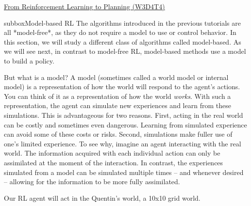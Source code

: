 \begin{textbox}{\href{https://compneuro.neuromatch.io/tutorials/W3D4_ReinforcementLearning/student/W3D4_Tutorial4.html}{From Reinforcement Learning to Planning (W3D4T4)} }

\begin{subbox}{subbox}{Model-based RL}
\scriptsize
The algorithms introduced in the previous tutorials are all *model-free*, as they do not require a model to use or control behavior. In this section, we will study a different class of algorithms called model-based. As we will see next, in contrast to model-free RL, model-based methods use a model to build a policy.

But what is a model? A model (sometimes called a world model or internal model) is a representation of how the world will respond to the agent's actions. You can think of it as a representation of how the world \textit{works}. With such a representation, the agent can simulate new experiences and learn from these simulations. This is advantageous for two reasons. First, acting in the real world can be costly and sometimes even dangerous. Learning from simulated experience can avoid some of these costs or risks. Second, simulations make fuller use of one's limited experience. To see why, imagine an agent interacting with the real world. The information acquired with each individual action can only be assimilated at the moment of the interaction. In contrast, the experiences simulated from a model can be simulated multiple times -- and whenever desired -- allowing for the information to be more fully assimilated.

Our RL agent will act in the Quentin's world, a 10x10 grid world. 
\begin{center}
    

\end{center}
\end{subbox}
\end{textbox}
